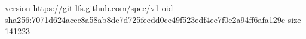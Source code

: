 version https://git-lfs.github.com/spec/v1
oid sha256:7071d624acec8a58ab8de7d725feedd0ce49f523edf4ee7f0e2a94ff6afa129c
size 141223
